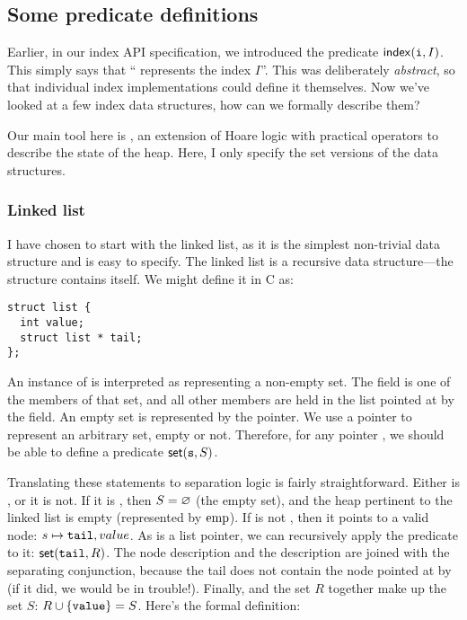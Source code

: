 \subsection{Some predicate definitions}

Earlier, in our index API specification,
  we introduced the predicate $\mathsf{index}(\texttt{i}, I)$.
This simply says that \enquote{ represents the index $I$}.
This was deliberately \emph{abstract},
  so that individual index implementations could define it themselves.
Now we've looked at a few index data structures,
  how can we formally describe them?

Our main tool here is ,
  an extension of Hoare logic with practical operators to describe the state of the heap.
Here, I only specify the set versions of the data structures.


\subsubsection{Linked list}

I have chosen to start with the linked list,
  as it is the simplest non-trivial data structure
  and is easy to specify.
The linked list is a recursive data structure---the structure contains itself.
We might  define it in C as:

\begin{verbatim}
struct list {
  int value;
  struct list * tail;
};
\end{verbatim}

An instance of  is interpreted as representing a non-empty set.
The  field is one of the members of that set,
  and all other members are held in the list pointed at by the  field.
An empty set is represented by the  pointer.
We use a pointer to represent an arbitrary set, empty or not.
Therefore, for any pointer ,
  we should be able to define a predicate $\mathsf{set}(\texttt{s}, S)$.

Translating these statements to separation logic is fairly straightforward.
Either  is , or it is not.
If it is , then
  $S = \varnothing$ (the empty set),
  and the heap pertinent to the linked list is empty (represented by $\mathord\mathrm{emp}$).
If  is not ,
  then it points to a valid  node:
  $s \mapsto \texttt{tail}, value$.
As  is a list pointer,
  we can recursively apply the predicate to it:
  $\mathsf{set}(\texttt{tail}, R)$.
The node description and the  description
  are joined with the separating conjunction,
  because the tail does not contain the node pointed at by 
  (if it did, we would be in trouble!).
Finally,  and the set $R$
  together make up the set $S$:
  $R \cup \left\{\texttt{value}\right\} = S$.
Here's the formal definition:

